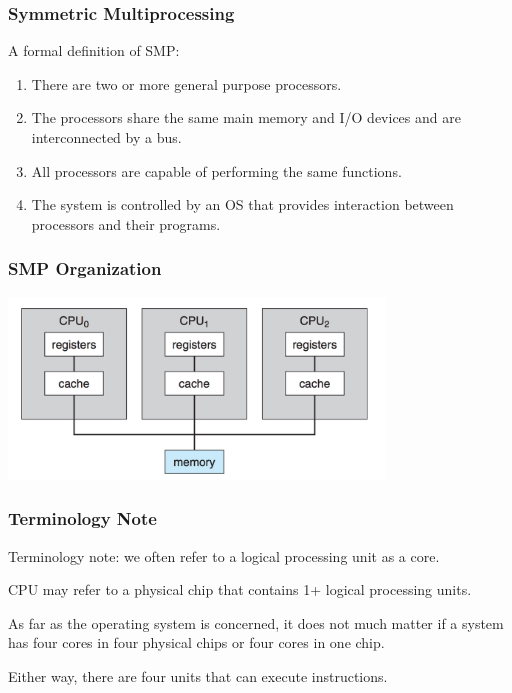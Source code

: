  
\begin{frame}
\frametitle{Symmetric Multiprocessing}


A formal definition of SMP:

\begin{enumerate}
	\item There are two or more general purpose processors.
	\item The processors share the same main memory and I/O devices and are interconnected by a bus.
	\item All processors are capable of performing the same functions.
	\item The system is controlled by an OS that provides interaction between processors and their programs.
\end{enumerate}

\end{frame}

 
\begin{frame}
\frametitle{SMP Organization}

\begin{center}
	\includegraphics[width=0.75\textwidth]{images/smp-architecture.png}
\end{center}


\end{frame}

 
\begin{frame}
\frametitle{Terminology Note}


Terminology note: we often refer to a logical processing unit as a \alert{core}. 

CPU may refer to a physical chip that contains 1+ logical processing units. 

As far as the operating system is concerned, it does not much matter if a system has four cores in four physical chips or four cores in one chip.

Either way, there are four units that can execute instructions.



\end{frame}

